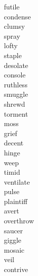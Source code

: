 \documentclass[b5paper, 11pt]{ctexart}
\begin{document}
\begin{multicols*}{3}
\begin{description}
\item[futile]

\item[condense]

\item[clumsy]

\item[spray]

\item[lofty]

\item[staple]

\item[desolate]

\item[console]

\item[ruthless]

\item[smuggle]

\item[shrewd]

\item[torment]

\item[moss]

\item[grief]

\item[decent]

\item[hinge]

\item[weep]

\item[timid]

\item[ventilate]

\item[pulse]

\item[plaintiff]

\item[avert]

\item[overthrow]

\item[saucer]

\item[giggle]

\item[mosaic]

\item[veil]

\item[contrive]


\end{description}
\end{multicols*}
\end{document}
